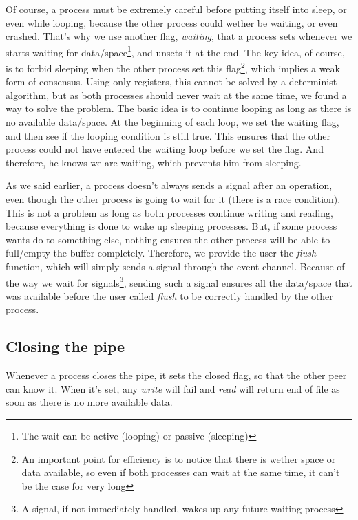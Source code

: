\documentclass[journal]{IEEEtran}
\begin{document}
Of course, a process must be extremely careful before putting itself into sleep, or even while looping, because the other process could wether be waiting, or even crashed. That's why we use another flag, \emph{waiting}, that a process sets whenever we starts waiting for data/space\footnote{The wait can be active (looping) or passive (sleeping)}, and unsets it at the end. The key idea, of course, is to forbid sleeping when the other process set this flag\footnote{An important point for efficiency is to notice that there is wether space or data available, so even if both processes can wait at the same time, it can't be the case for very long}, which implies a weak form of consensus.
Using only registers, this cannot be solved by a determinist algorithm, but as both processes should never wait at the same time, we found a way to solve the problem. The basic idea is to continue looping as long as there is no available data/space. At the beginning of each loop, we set the waiting flag, and then see if the looping condition is still true.
This ensures that the other process could not have entered the waiting loop before we set the flag. And therefore, he knows we are waiting, which prevents him from sleeping.

As we said earlier, a process doesn't always sends a signal after an operation, even though the other process is going to wait for it (there is a race condition). This is not a problem as long as both processes continue writing and reading, because everything is done to wake up sleeping processes. But, if some process wants do to something else, nothing ensures the other process will be able to full/empty the buffer completely. Therefore, we provide the user the \emph{flush} function, which will simply sends a signal through the event channel. Because of the way we wait for signals\footnote{A signal, if not immediately handled, wakes up any future waiting process}, sending such a signal ensures all the data/space that was available before the user called \emph{flush} to be correctly handled by the other process. 


\subsection{Closing the pipe}

Whenever a process closes the pipe, it sets the closed flag, so that the other peer can know it. When it's set, any \emph{write} will fail and \emph{read} will return end of file as soon as there is no more available data.  
\end{document}
